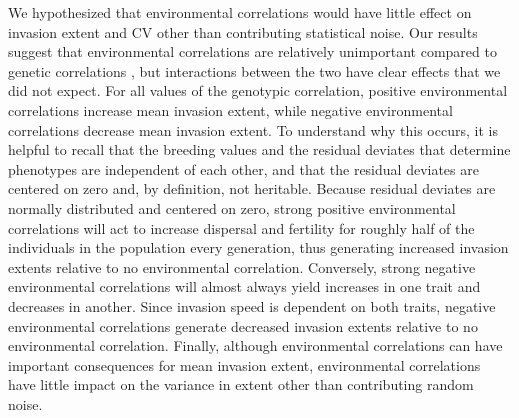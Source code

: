 We hypothesized that environmental correlations would have little effect on invasion extent and CV other than contributing statistical noise. Our results suggest that environmental correlations are relatively unimportant compared to genetic correlations , but interactions between the two have clear effects that we did not expect. For all values of the genotypic correlation, positive environmental correlations increase mean invasion extent, while negative environmental correlations decrease mean invasion extent. To understand why this occurs, it is helpful to recall that the breeding values and the residual deviates that determine phenotypes are independent of each other, and that the residual deviates are centered on zero and, by definition, not heritable. Because residual deviates are normally distributed and centered on zero, strong positive environmental correlations will act to increase dispersal and fertility for roughly half of the individuals in the population every generation, thus generating increased invasion extents relative to no environmental correlation. Conversely, strong negative environmental correlations will almost always yield increases in one trait and decreases in another. Since invasion speed is dependent on both traits, negative environmental correlations generate decreased invasion extents relative to no environmental correlation.  Finally, although environmental correlations can have important consequences for mean invasion extent, environmental correlations have little impact on the variance in extent other than contributing random noise.

